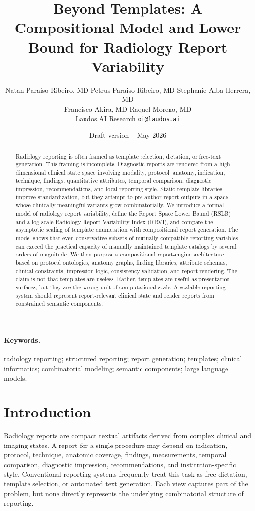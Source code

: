 \documentclass[11pt]{article}
\title{Beyond Templates: A Compositional Model and Lower Bound for Radiology Report Variability}
\author{
  Natan Paraiso Ribeiro, MD \quad Petrus Paraiso Ribeiro, MD \quad Stephanie Alba Herrera, MD \\
  Francisco Akira, MD \quad Raquel Moreno, MD \\[6pt]
  \normalsize Laudos.AI Research \quad\textbullet\quad \texttt{oi@laudos.ai}
}
\date{Draft version -- May 2026}
\begin{document}
\maketitle

\begin{abstract}
Radiology reporting is often framed as template selection, dictation, or free-text generation. This framing is incomplete. Diagnostic reports are rendered from a high-dimensional clinical state space involving modality, protocol, anatomy, indication, technique, findings, quantitative attributes, temporal comparison, diagnostic impression, recommendations, and local reporting style. Static template libraries improve standardization, but they attempt to pre-author report outputs in a space whose clinically meaningful variants grow combinatorially. We introduce a formal model of radiology report variability, define the Report Space Lower Bound (RSLB) and a log-scale Radiology Report Variability Index (RRVI), and compare the asymptotic scaling of template enumeration with compositional report generation. The model shows that even conservative subsets of mutually compatible reporting variables can exceed the practical capacity of manually maintained template catalogs by several orders of magnitude. We then propose a compositional report-engine architecture based on protocol ontologies, anatomy graphs, finding libraries, attribute schemas, clinical constraints, impression logic, consistency validation, and report rendering. The claim is not that templates are useless. Rather, templates are useful as presentation surfaces, but they are the wrong unit of computational scale. A scalable reporting system should represent report-relevant clinical state and render reports from constrained semantic components.
\end{abstract}

\paragraph{Keywords.} radiology reporting; structured reporting; report generation; templates; clinical informatics; combinatorial modeling; semantic components; large language models.

\section{Introduction}
Radiology reports are compact textual artifacts derived from complex clinical and imaging states. A report for a single procedure may depend on indication, protocol, technique, anatomic coverage, findings, measurements, temporal comparison, diagnostic impression, recommendations, and institution-specific style. Conventional reporting systems frequently treat this task as free dictation, template selection, or automated text generation. Each view captures part of the problem, but none directly represents the underlying combinatorial structure of reporting.
\end{document}

